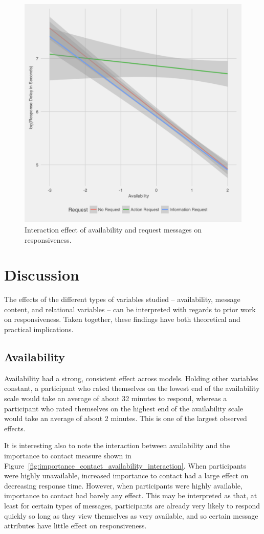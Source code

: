 \documentclass[12pt]{nuthesis}	%
\begin{document}
\begin{figure}[h]
\centering
\includegraphics[width=.7\textwidth]{figures/request_availability_interaction}
\caption{Interaction effect of availability and request messages on responsiveness.}
\label{fig:request_availability_interaction}
\end{figure}


\chapter{Discussion}

The effects of the different types of variables studied -- availability, message content, and relational variables -- can be interpreted with regards to prior work on responsiveness. Taken together, these findings have both theoretical and practical implications.

\section{Availability}

Availability had a strong, consistent effect across models. Holding other variables constant, a participant who rated themselves on the lowest end of the availability scale would take an average of about 32 minutes to respond, whereas a participant who rated themselves on the highest end of the availability scale would take an average of about 2 minutes. This is one of the largest observed effects.

It is interesting also to note the interaction between availability and the importance to contact measure shown in Figure~\ref{fig:importance_contact_availability_interaction}. When participants were highly unavailable, increased importance to contact had a large effect on decreasing response time. However, when participants were highly available, importance to contact had barely any effect. This may be interpreted as that, at least for certain types of messages, participants are already very likely to respond quickly so long as they view themselves as very available, and so certain message attributes have little effect on responsiveness.
\end{document}
